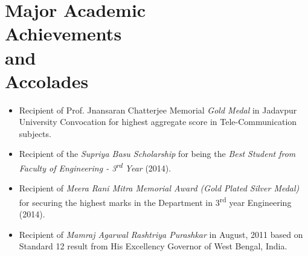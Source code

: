 \documentclass[margin,line]{resume}
\begin{document}
\begin{resume}
\begin{itemize}


\end{itemize}

 
\section{\mysidestyle Major Academic\\Achievements\\and\\Accolades} 
 \begin{itemize}
\item Recipient of Prof. Jnansaran Chatterjee Memorial \textit{Gold Medal} in Jadavpur University Convocation for highest aggregate score in Tele-Communication subjects. 
\item Recipient of the \textit{Supriya Basu Scholarship} for being the \textit{Best Student from Faculty of Engineering - 3\textsuperscript{rd} Year} (2014).
\item Recipient of \textit{Meera Rani Mitra Memorial Award (Gold Plated Silver Medal)} for securing the highest marks in the Department in 3\textsuperscript{rd} year Engineering (2014). %
\item Recipient of \textit{Mamraj Agarwal Rashtriya Purashkar} in August, 2011 based on Standard 12 result from His Excellency Governor of West Bengal, India.
\end{itemize}

   



\end{resume}
\end{document}
